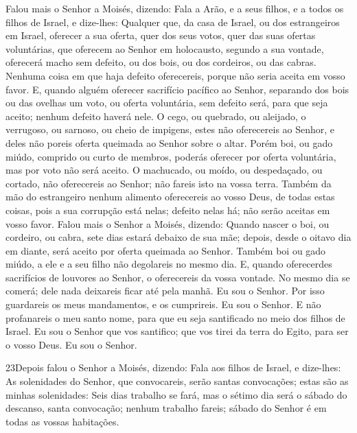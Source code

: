 Falou mais o Senhor a Moisés, dizendo: Fala a Arão, e a seus
filhos, e a todos os filhos de Israel, e dize-lhes: Qualquer que, da
casa de Israel, ou dos estrangeiros em Israel, oferecer a sua
oferta, quer dos seus votos, quer das suas ofertas voluntárias, que
oferecem ao Senhor em holocausto, segundo a sua vontade,
oferecerá macho sem defeito, ou dos bois, ou dos cordeiros, ou das
cabras. Nenhuma coisa em que haja defeito oferecereis, porque
não seria aceita em vosso favor. E, quando alguém oferecer
sacrifício pacífico ao Senhor, separando dos bois ou das ovelhas um
voto, ou oferta voluntária, sem defeito será, para que seja aceito;
nenhum defeito haverá nele. O cego, ou quebrado, ou aleijado, o
verrugoso, ou sarnoso, ou cheio de impigens, estes não oferecereis
ao Senhor, e deles não poreis oferta queimada ao Senhor sobre o
altar. Porém boi, ou gado miúdo, comprido ou curto de membros,
poderás oferecer por oferta voluntária, mas por voto não será
aceito. O machucado, ou moído, ou despedaçado, ou cortado, não
oferecereis ao Senhor; não fareis isto na vossa terra. Também
da mão do estrangeiro nenhum alimento oferecereis ao vosso Deus, de
todas estas coisas, pois a sua corrupção está nelas; defeito nelas
há; não serão aceitas em vosso favor. Falou mais o Senhor a
Moisés, dizendo: Quando nascer o boi, ou cordeiro, ou cabra,
sete dias estará debaixo de sua mãe; depois, desde o oitavo dia em
diante, será aceito por oferta queimada ao Senhor. Também boi
ou gado miúdo, a ele e a seu filho não degolareis no mesmo dia. 
E, quando oferecerdes sacrifícios de louvores ao Senhor, o
oferecereis da vossa vontade. No mesmo dia se comerá; dele nada
deixareis ficar até pela manhã. Eu sou o Senhor. Por isso
guardareis os meus mandamentos, e os cumprireis. Eu sou o Senhor.
E não profanareis o meu santo nome, para que eu seja
santificado no meio dos filhos de Israel. Eu sou o Senhor que vos
santifico; que vos tirei da terra do Egito, para ser o vosso
Deus. Eu sou o Senhor.

\medskip

\lettrine{23} Depois falou o Senhor a Moisés, dizendo:
Fala aos filhos de Israel, e dize-lhes: As solenidades do
Senhor, que convocareis, serão santas convocações; estas são as
minhas solenidades: Seis dias trabalho se fará, mas o sétimo dia
será o sábado do descanso, santa convocação; nenhum trabalho fareis;
sábado do Senhor é em todas as vossas habitações.

